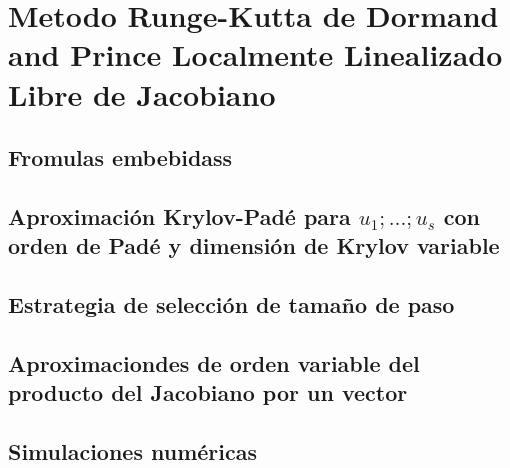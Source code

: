 \chapter{Metodo Runge-Kutta de Dormand and Prince Localmente Linealizado Libre de
Jacobiano}\label{chapter:llrk-fj}

\section{Fromulas embebidass}

\section{Aproximación Krylov-Padé para ${u_1;\ldots;u_s}$ con orden de Padé y dimensión de Krylov variable}

\section{Estrategia de selección de tamaño de paso}

\section{Aproximaciondes de orden variable del producto del Jacobiano por un vector}

\section{Simulaciones numéricas}